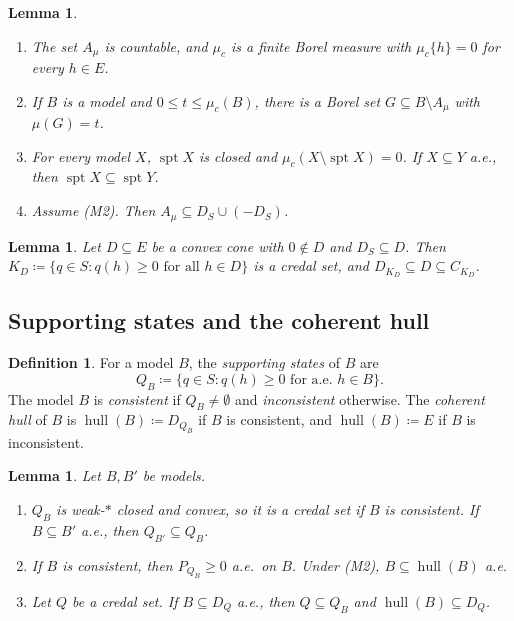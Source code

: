 \documentclass[11pt]{article}
\newcommand{\hull}{\operatorname{hull}}
\DeclareMathOperator{\spt}{spt}
\theoremstyle{plain}
\newtheorem{lemma}[theorem]{Lemma}
\theoremstyle{definition}
\newtheorem{definition}[theorem]{Definition}
\theoremstyle{remark}
\begin{document}
\begin{lemma}\label{lem:tools}
\begin{enumerate}[label=(\alph*)]
  \item The set $A_\mu$ is countable, and $\mu_c$ is a finite Borel measure with $\mu_c\{h\}=0$
  for every $h\in E$.
  \item If $B$ is a model and $0\le t\le\mu_c(B)$, there is a Borel set $G\subseteq B\setminus
  A_\mu$ with $\mu(G)=t$.
  \item For every model $X$, $\spt X$ is closed and $\mu_c(X\setminus\spt X)=0$. If $X\subseteq
  Y$ a.e., then $\spt X\subseteq\spt Y$.
  \item Assume (M2). Then $A_\mu\subseteq D_S\cup(-D_S)$.
\end{enumerate}
\end{lemma}

\begin{lemma}\label{lem:identify}
Let $D\subseteq E$ be a convex cone with $0\notin D$ and $D_S\subseteq D$. Then
$K_D\coloneqq\{q\in S:q(h)\ge0\text{ for all }h\in D\}$ is a credal set, and $D_{K_D}
\subseteq D\subseteq C_{K_D}$.
\end{lemma}

\subsection{Supporting states and the coherent hull}

\begin{definition}\label{def:hull}
For a model $B$, the \emph{supporting states} of $B$ are
\[
  Q_B\coloneqq\{q\in S:q(h)\ge0\text{ for a.e.\ }h\in B\}.
\]
The model $B$ is \emph{consistent} if $Q_B\ne\emptyset$ and \emph{inconsistent} otherwise. The
\emph{coherent hull} of $B$ is $\hull(B)\coloneqq D_{Q_B}$ if $B$ is consistent, and
$\hull(B)\coloneqq E$ if $B$ is inconsistent.
\end{definition}

\begin{lemma}\label{lem:hull}
Let $B,B'$ be models.
\begin{enumerate}[label=(\alph*)]
  \item $Q_B$ is weak-$\ast$ closed and convex, so it is a credal set if $B$ is consistent. If
  $B\subseteq B'$ a.e., then $Q_{B'}\subseteq Q_B$.
  \item If $B$ is consistent, then $P_{Q_B}\ge0$ a.e.\ on $B$. Under (M2), $B\subseteq\hull(B)$
  a.e.
  \item Let $Q$ be a credal set. If $B\subseteq D_Q$ a.e., then $Q\subseteq Q_B$ and
  $\hull(B)\subseteq D_Q$.
\end{enumerate}
\end{lemma}
\end{document}
